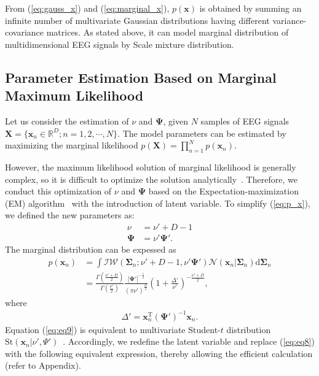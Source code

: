 \documentclass[journal]{IEEEtran}
\begin{document}
From (\ref{eq:gauss_x}) and (\ref{eq:marginal_x}), $p(\mathbf{x})$ is obtained by summing an infinite number of  multivariate Gaussian distributions having different variance-covariance matrices.
As stated above, it can model marginal distribution of multidimensional EEG signals by Scale mixture distribution.

\subsection{Parameter Estimation Based on Marginal Maximum Likelihood}
Let us consider the estimation of $\nu$ and $\mathbf{\Psi}$, given $N$ samples of EEG signals $\mathbf{X} = \{\mathbf{x}_n \in \mathbb{R}^{D}; n=1,2,\cdots,N \}$. The model parameters can be estimated by maximizing the marginal likelihood $p(\mathbf{X}) = \prod_{n=1}^{N} p(\mathbf{x}_n)$.

However, the maximum likelihood solution of marginal likelihood is generally complex, so it is difficult to optimize the solution analytically~\cite{t2006}.
Therefore, we conduct this optimization of $\nu$ and $\mathbf{\Psi}$ based on the Expectation-maximization (EM) algorithm~\cite{Models1998} with the introduction of latent variable.
To simplify (\ref{eq:p_x}), we defined the new parameters as:
%
\begin{align}
	\label{eq:eq6}
	\nu&= \nu' + D - 1 \\
	\label{eq:eq7}
	\mathbf{\Psi}&= \nu' \mathbf{\Psi}'.
\end{align}
The marginal distribution can be expessed as
\begin{align}%
\label{eq:eq8}
p(\mathbf{x}_n) &=\int \mathcal{IW}(\mathbf{\Sigma}_n; \nu'+D-1, \nu' \mathbf{\Psi}') \mathcal{N}(\mathbf{x}_n|\mathbf{\Sigma}_n) \mathrm{d} {\mathbf{\Sigma}_n} \\
\label{eq:eq9}
&=\frac{\Gamma(\frac{\nu'+D}{2})}{\Gamma(\frac{\nu'}{2})} \frac{|{\mathbf{\Psi}'}|^{-\frac{1}{2}}}{\left(\pi \nu' \right)^{\frac{D}{2}}} \left(1+\frac{\Delta '}{\nu '} \right)^{-\frac{\nu'+D}{2}},
\end{align}
where
\begin{align}
	\Delta ' = \mathbf{x}_n^\mathrm{T} ({\mathbf{\Psi} '})^{-1} \mathbf{x}_n.
\end{align}
Equation (\ref{eq:eq9}) is equivalent to multivariate Student-$t$ distribution $\mathrm{St}(\mathbf{x}_n|\nu', \Psi')$~\cite{t2006}. %
Accordingly, we redefine the latent variable and replace (\ref{eq:eq8}) with the following equivalent expression, thereby allowing the efficient calculation (refer to Appendix).
\end{document}
